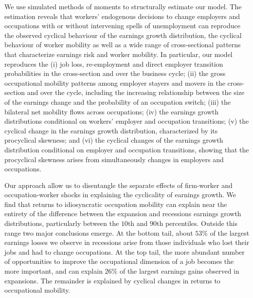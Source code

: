 \documentclass[12pt]{article}
\theoremstyle{definition}
\begin{document}
We use simulated methods of moments to structurally estimate our model. The estimation reveals that workers' endogenous decisions to change employers and occupations with or without intervening spells of unemployment can reproduce the observed cyclical behaviour of the earnings growth distribution, the cyclical behaviour of worker mobility as well as a wide range of cross-sectional patterns that characterize earnings risk and worker mobility. In particular, our model reproduces the (i)  job loss, re-employment and direct employer transition probabilities in the cross-section and over the  business cycle; (ii) the gross occupational mobility patterns among employer stayers and movers in  the cross-section and over the cycle, including the increasing relationship between the size of the earnings change and the probability of an occupation switch; (iii) the bilateral net mobility flows across  occupations; (iv) the earnings growth distributions conditional on workers' employer and occupation  transitions; (v) the cyclical change in the earnings growth distribution, characterized by its procyclical  skewness; and (vi) the cyclical changes of the earnings growth distribution conditional on employer  and occupation transitions, showing that the procyclical skewness arises from simultaneously changes  in employers and occupations.

Our approach allow us to disentangle the separate effects of firm-worker and occupation-worker shocks in explaining the cyclicality of earnings growth. We find that returns to idiosyncratic occupation mobility can explain near the entirety of the difference between the expansion and recessions earnings growth distributions, particularly between the $10$th and $90$th percentiles. Outside this range two major conclusions emerge. At the bottom tail, about $53\%$ of the largest earnings losses we observe in recessions arise from those individuals who lost their jobs and had to change occupations. At the top tail, the more abundant number of opportunities to improve the occupational dimension of a job becomes the more important, and can explain $26\%$ of the largest earnings gains observed in expansions. The remainder is explained by cyclical changes in returns to occupational mobility.
\end{document}
